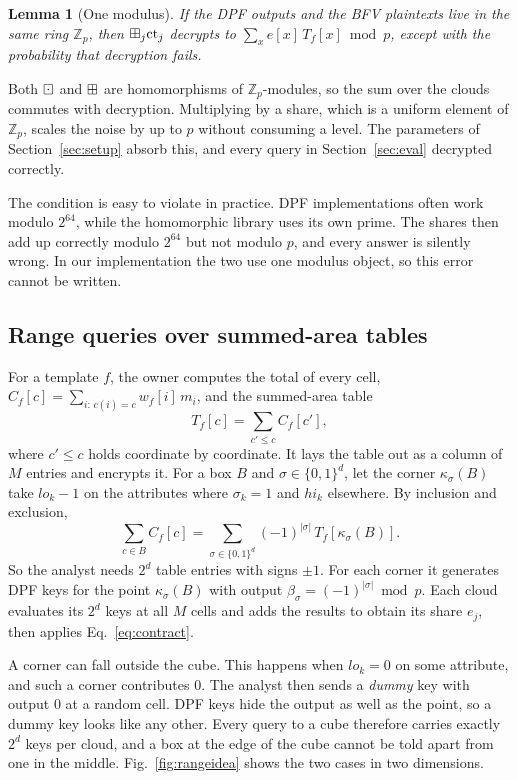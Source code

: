 \documentclass[10pt,journal,compsoc]{IEEEtran}
\newtheorem{lemma}{Lemma}
\begin{document}
\begin{lemma}[One modulus]
\label{lem:compat}
If the DPF outputs and the BFV plaintexts live in the same ring $\mathbb{Z}_p$,
then $\boxplus_j\mathrm{ct}_j$ decrypts to $\sum_x e[x]\,T_f[x]\bmod p$, except
with the probability that decryption fails.
\end{lemma}
\begin{IEEEproof}
Both $\boxdot$ and $\boxplus$ are homomorphisms of $\mathbb{Z}_p$-modules, so the
sum over the clouds commutes with decryption. Multiplying by a share, which is
a uniform element of $\mathbb{Z}_p$, scales the noise by up to $p$ without
consuming a level. The parameters of Section~\ref{sec:setup} absorb this, and
every query in Section~\ref{sec:eval} decrypted correctly.
\end{IEEEproof}

The condition is easy to violate in practice. DPF implementations often work
modulo $2^{64}$, while the homomorphic library uses its own prime. The
shares then add up correctly modulo $2^{64}$ but not modulo $p$, and every
answer is silently wrong. In our implementation the two use one modulus
object, so this error cannot be written.

\subsection{Range queries over summed-area tables}
\label{sec:range}
For a template $f$, the owner computes the total of every cell,
$C_f[c]=\sum_{i:\,c(i)=c}w_f[i]\,m_i$, and the summed-area table
\[
T_f[c]=\sum_{c'\le c}C_f[c'],
\]
where $c'\le c$ holds coordinate by coordinate. It lays the table out as a
column of $M$ entries and encrypts it. For a box $B$ and
$\sigma\in\{0,1\}^d$, let the corner $\kappa_\sigma(B)$ take
$\mathit{lo}_k-1$ on the attributes where $\sigma_k=1$ and $\mathit{hi}_k$
elsewhere. By inclusion and exclusion,
\begin{equation}
\label{eq:ie}
\sum_{c\in B}C_f[c]=\sum_{\sigma\in\{0,1\}^d}(-1)^{|\sigma|}\,T_f[\kappa_\sigma(B)].
\end{equation}
So the analyst needs $2^d$ table entries with signs $\pm1$. For each corner it
generates DPF keys for the point $\kappa_\sigma(B)$ with output
$\beta_\sigma=(-1)^{|\sigma|}\bmod p$. Each cloud evaluates its $2^d$ keys at
all $M$ cells and adds the results to obtain its share $e_j$, then applies
Eq.~\eqref{eq:contract}.

A corner can fall outside the cube. This happens when $\mathit{lo}_k=0$ on
some attribute, and such a corner contributes $0$. The analyst then sends a
\emph{dummy} key with output $0$ at a random cell. DPF keys hide the output as
well as the point, so a dummy key looks like any other. Every query to a cube
therefore carries exactly $2^d$ keys per cloud, and a box at the edge of the
cube cannot be told apart from one in the middle. Fig.~\ref{fig:rangeidea}
shows the two cases in two dimensions.
\end{document}
